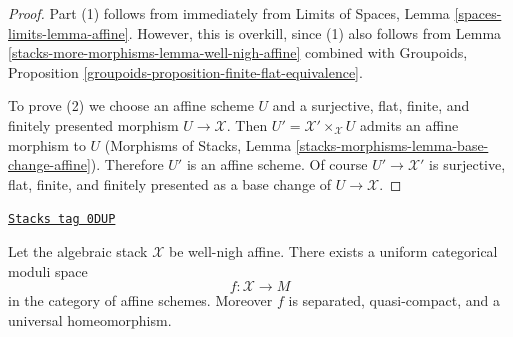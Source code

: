 \begin{proof}
Part (1) follows from immediately from
Limits of Spaces, Lemma \ref{spaces-limits-lemma-affine}.
However, this is overkill, since (1) also follows from
Lemma \ref{stacks-more-morphisms-lemma-well-nigh-affine} combined with
Groupoids, Proposition
\ref{groupoids-proposition-finite-flat-equivalence}.

\medskip\noindent
To prove (2) we choose an affine scheme $U$ and a
surjective, flat, finite, and finitely presented morphism $U \to \mathcal{X}$.
Then $U' = \mathcal{X}' \times_\mathcal{X} U$ admits an affine
morphism to $U$ (Morphisms of Stacks, Lemma
\ref{stacks-morphisms-lemma-base-change-affine}).
Therefore $U'$ is an affine scheme. Of course
$U' \to \mathcal{X}'$ is surjective, flat, finite, and finitely presented
as a base change of $U \to \mathcal{X}$.
\end{proof}

\begin{lemma}
\label{stacks-more-morphisms-lemma-well-nigh-affine-moduli-space}
\href{https://stacks.math.columbia.edu/tag/0DUP}{\texttt{Stacks tag 0DUP}}

Let the algebraic stack $\mathcal{X}$ be well-nigh affine. There exists
a uniform categorical moduli space
$$
f : \mathcal{X} \longrightarrow M
$$
in the category of affine schemes. Moreover
$f$ is separated, quasi-compact, and a universal homeomorphism.
\end{lemma}

